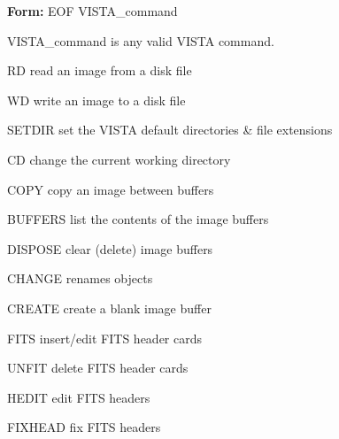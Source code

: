 {\newpage\clearpage
{}%
\begin{command}
  \item[\textbf{Form: } EOF  VISTA\_command\hfill]{}
  \item[VISTA\_command]{is any valid VISTA command.}
\end{command}%
\lthtmlfigureZ
\lthtmlcheckvsize\clearpage}

{\newpage\clearpage
{}%
\begin{example}
  \item[RD\hfill]{read an image from a disk file}
  \item[WD\hfill]{write an image to a disk file}
\end{example}%
\lthtmlfigureZ
\lthtmlcheckvsize\clearpage}

{\newpage\clearpage
{}%
\begin{example}
   \item[SETDIR\hfill]{set the VISTA default directories \& file extensions}
   \item[CD\hfill]{change the current working directory}
\end{example}%
\lthtmlfigureZ
\lthtmlcheckvsize\clearpage}

{\newpage\clearpage
{}%
\begin{example}
  \item[COPY\hfill]{copy an image between buffers}
  \item[BUFFERS\hfill]{list the contents of the image buffers}
  \item[DISPOSE\hfill]{clear (delete) image buffers}
  \item[CHANGE\hfill]{renames objects}
  \item[CREATE\hfill]{create a blank image buffer}
\end{example}%
\lthtmlfigureZ
\lthtmlcheckvsize\clearpage}

{\newpage\clearpage
{}%
\begin{example}
  \item[FITS\hfill]{insert/edit FITS header cards}
  \item[UNFIT\hfill]{delete FITS header cards}
  \item[HEDIT\hfill]{edit FITS headers}
  \item[FIXHEAD\hfill]{fix FITS headers}
\end{example}%
\lthtmlfigureZ
\lthtmlcheckvsize\clearpage}

